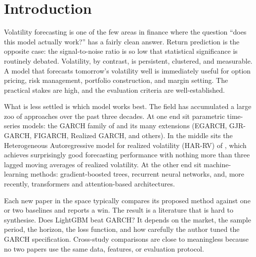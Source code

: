 \section{Introduction}\label{sec:intro}

Volatility forecasting is one of the few areas in finance where the
question ``does this model actually work?'' has a fairly clean answer.
Return prediction is the opposite case: the signal-to-noise ratio is so
low that statistical significance is routinely debated. Volatility, by
contrast, is persistent, clustered, and measurable. A model that
forecasts tomorrow's volatility well is immediately useful for option
pricing, risk management, portfolio construction, and margin setting. The
practical stakes are high, and the evaluation criteria are
well-established.

What is less settled is which model works best. The field has accumulated
a large zoo of approaches over the past three decades. At one end sit
parametric time-series models: the GARCH family of \citet{Bollerslev1986}
and its many extensions (EGARCH, GJR-GARCH, FIGARCH, Realized GARCH, and
others). In the middle sits the Heterogeneous Autoregressive model for
realized volatility (HAR-RV) of \citet{Corsi2009}, which achieves
surprisingly good forecasting performance with nothing more than three
lagged moving averages of realized volatility. At the other end sit
machine-learning methods: gradient-boosted trees, recurrent neural
networks, and, more recently, transformers and attention-based
architectures.

Each new paper in the space typically compares its proposed method
against one or two baselines and reports a win. The result is a
literature that is hard to synthesise. Does LightGBM beat GARCH? It
depends on the market, the sample period, the horizon, the loss function,
and how carefully the author tuned the GARCH specification. Cross-study
comparisons are close to meaningless because no two papers use the same
data, features, or evaluation protocol.


